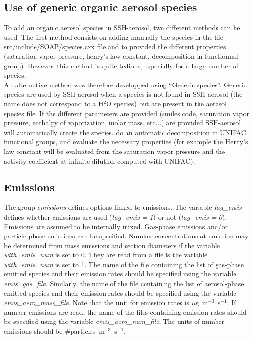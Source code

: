 \documentclass[a4paper,11pt]{article}
\begin{document}
\subsection{Use of generic organic aerosol species}

To add an organic aerosol species in SSH-aerosol, two different methods can be used. The first method consists on adding manually the species in the file src/include/SOAP/species.cxx file and to provided the different properties (saturation vapor pressure, henry's law constant, decomposition in functionnal group). However, this method is quite tedious, especially for a large number of species.\\
An alternative method was therefore developped using ``Generic species''. Generic species are used by SSH-aerosol when a species is not found in SSH-aerosol (the name does not correspond to a H$^2$O species) but are present in the aerosol species file. If the different parameters are provided (smiles code, saturation vapor pressure, enthalpy of vaporization, molar mass, etc...) are provided SSH-aerosol will automatically create the species, do an automatic decomposition in UNIFAC functional groups, and evaluate the necessary properties (for example the Henry's law constant will be evaluated from the saturation vapor pressure and the activity coefficient at infinite dilution computed with UNIFAC).\\   


\subsection{Emissions}

The group {\textit{emissions}} defines options linked to emissions. The variable {\textit{tag\_emis}} defines whether emissions are used ({\textit{tag\_emis = 1}}) or not ({\textit{tag\_emis = 0}}).
Emissions are assumed to be internally mixed. Gas-phase emissions and/or particle-phase emissions can be specified. Number concentrations at emission may be determined from mass emissions and section diameters if the variable {\textit{with\_emis\_num}} is set to 0. They are read from a file is the variable {\textit{with\_emis\_num}} is set to 1. 
The name of the file containing the list of gas-phase emitted species and their emission rates should be specified using the variable {\textit{emis\_gas\_file}}. Similarly, the name of the file containing the list of aerosol-phase emitted species and their emission rates should be specified using the variable {\textit{emis\_aero\_mass\_file}}. Note that the unit for emission rates is $\mu$g~m$^{-3}$~s$^{-1}$. If number emissions are read, the name of the files containing emission rates should be specified using the variable {\textit{emis\_aero\_num\_file}}. The units of number emissions should be \#particles~m$^{-3}$~s$^{-1}$.
\end{document}
